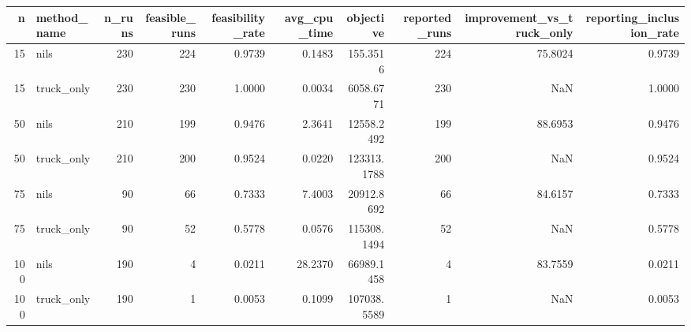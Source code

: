 \begin{tabular}{rlrrrrrrrr}
\toprule
n & method_name & n_runs & feasible_runs & feasibility_rate & avg_cpu_time & objective & reported_runs & improvement_vs_truck_only & reporting_inclusion_rate \\
\midrule
15 & nils & 230 & 224 & 0.9739 & 0.1483 & 155.3516 & 224 & 75.8024 & 0.9739 \\
15 & truck_only & 230 & 230 & 1.0000 & 0.0034 & 6058.6771 & 230 & NaN & 1.0000 \\
50 & nils & 210 & 199 & 0.9476 & 2.3641 & 12558.2492 & 199 & 88.6953 & 0.9476 \\
50 & truck_only & 210 & 200 & 0.9524 & 0.0220 & 123313.1788 & 200 & NaN & 0.9524 \\
75 & nils & 90 & 66 & 0.7333 & 7.4003 & 20912.8692 & 66 & 84.6157 & 0.7333 \\
75 & truck_only & 90 & 52 & 0.5778 & 0.0576 & 115308.1494 & 52 & NaN & 0.5778 \\
100 & nils & 190 & 4 & 0.0211 & 28.2370 & 66989.1458 & 4 & 83.7559 & 0.0211 \\
100 & truck_only & 190 & 1 & 0.0053 & 0.1099 & 107038.5589 & 1 & NaN & 0.0053 \\
\bottomrule
\end{tabular}
